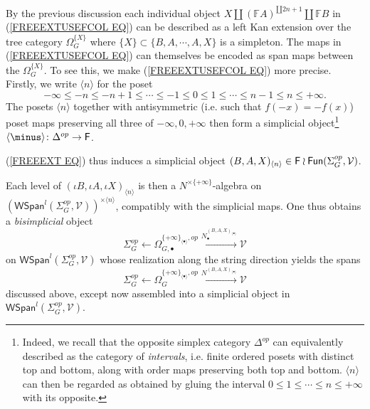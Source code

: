\documentclass[a4paper,10pt]{article}%
\begin{document}
By the previous discussion each individual object 
$X \amalg (\mathbb{F}A)^{\amalg 2n+1} \amalg \mathbb{F}B$ in
(\ref{FREEEXTUSEFCOL EQ})
can be described as a left Kan extension over the tree category 
$\Omega_{G}^{\{X\}}$ where 
$\{X\} \subset \{B,A,\cdots,A,X\}$ is a simpleton.
The maps in (\ref{FREEEXTUSEFCOL EQ}) can themselves be encoded as span maps between the $\Omega_{G}^{\{X\}}$.
To see this, we make (\ref{FREEEXTUSEFCOL EQ}) more precise.
Firstly, we write $\langle n \rangle$ for the poset
\[
- \infty \leq -n \leq -n+1 \leq
\cdots
\leq -1 \leq 0 \leq 1 \leq
\cdots
\leq n-1 \leq n \leq + \infty.
\]
The posets $\langle n \rangle$ together with antisymmetric (i.e. such that $f(-x)=-f(x)$) poset maps preserving all three of $-\infty, 0, +\infty$
then form a simplicial object\footnote{Indeed, we recall that the opposite simplex category $\Delta^{op}$ can equivalently described as the category of \textit{intervals}, i.e. finite ordered posets with distinct top and bottom, along with order maps preserving both top and bottom.
  $\langle n \rangle$ can then be regarded as obtained by gluing the interval $0\leq 1 \leq \cdots \leq n \leq + \infty$ with its opposite.}
$\langle \minus \rangle \colon \Delta^{op} \to \Fin$.


(\ref{FREEEXT EQ}) thus induces a simplicial object
$(B,A,X)_{\langle n \rangle} \in \mathsf{F} \wr \mathsf{Fun}(\Sigma_G^{op}, \mathcal{V})$.

Each level of $(\iota B,\iota A,\iota X)_{\langle n \rangle}$ is then a $N^{\times \{+\infty\}}$-algebra on 
$\left(
  \mathsf{WSpan}^l(\Sigma_G^{op},\mathcal{V})
\right)^{\times \langle n \rangle}$, compatibly with the simplicial maps. One thus obtains a \textit{bisimplicial} object 
\[
\Sigma_G^{op} \leftarrow 
\Omega_{G,\bullet}^{\{+\infty\}_{\langle \bullet \rangle},op}
\xrightarrow{N_{\bullet}^{(B,A,X)_{\langle \bullet \rangle}}}
\mathcal{V}
\]
on $\mathsf{WSpan}^l(\Sigma_G^{op},\mathcal{V})$
whose realization along the string direction yields the
spans 
\begin{equation}\label{PARTREALSPAN EQ}
  \Sigma_G^{op} \leftarrow 
  \Omega_{G}^{\{+\infty\}_{\langle \bullet \rangle},op}
  \xrightarrow{N^{(B,A,X)_{\langle \bullet \rangle}}}
  \mathcal{V}
\end{equation}
discussed above, except now assembled into a simplicial object in $\mathsf{WSpan}^l(\Sigma_G^{op},\mathcal{V})$.
\end{document}
